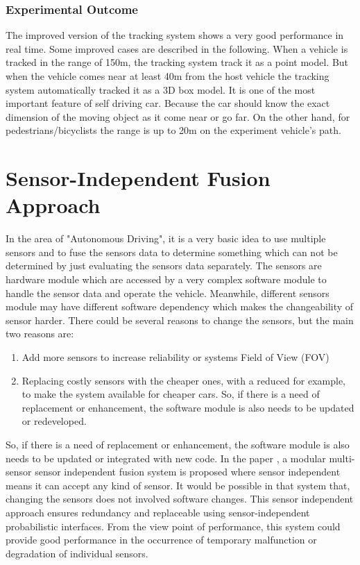 \subsubsection{Experimental Outcome}
The improved version of the tracking system shows a very good performance in real time\cite{Cho_2014}. Some improved cases are described in the following. When a vehicle is tracked in the range of 150m, the tracking system track it as a point model. But when the vehicle comes near at least 40m from the host vehicle the tracking system automatically tracked it as a 3D box model. It is one of the most important feature of self driving car. Because the car should know the exact dimension of the moving object as it come near or go far\cite{Cho_2014}. On the other hand, for pedestrians/bicyclists the range is up to 20m on the experiment vehicle's path.

\section{Sensor-Independent Fusion Approach}
In the area of "Autonomous Driving", it is a very basic idea to use multiple sensors and to fuse the sensors data to determine something which can not be determined by just evaluating the sensors data separately. The sensors are hardware module which are accessed by a very complex software module to handle the sensor data and operate the vehicle. Meanwhile, different sensors module may have different software dependency which makes the changeability of sensor harder. There could be several reasons to change the sensors, but the main two reasons are: 
\begin{enumerate}
    \item Add more sensors to increase reliability or systems Field of View (FOV)\cite{Kunz_2015}
    \item Replacing costly sensors with the cheaper ones, with a reduced for example, to make the system available for cheaper cars. So, if there is a need of replacement or enhancement, the software module is also needs to be updated or redeveloped.
\end{enumerate}
So, if there is a need of replacement or enhancement, the software module is also needs to be updated or integrated with new code. In the paper \cite{Kunz_2015}, a modular multi-sensor sensor independent fusion system is proposed where sensor independent means it can accept any kind of sensor. It would be possible in that system that, changing the sensors does not involved software changes. This sensor independent approach ensures redundancy and replaceable using sensor-independent probabilistic interfaces\cite{Kunz_2015}. From the view point of performance, this system could provide good performance in the occurrence of temporary malfunction or degradation of individual sensors.

